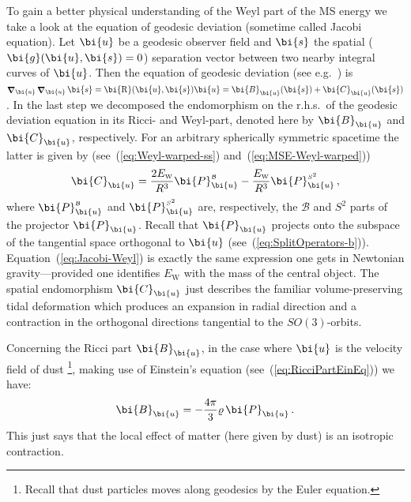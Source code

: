 \documentclass
[rmp,aps,twocolumn,showpacs,preprintnumbers,amsmath,amssymb]{revtex4}
\theoremstyle{plain}
\theoremstyle{definition}
\theoremstyle{remark}
\newcommand{\sss}{\scriptscriptstyle}
\newcommand{\ind}[1]{{\sss \text{#1}}}        %
\DeclareMathOperator{\LC}{\bm{\nabla}}        %
\DeclareMathOperator{\R}{\bi{R}}              %
\newcommand{\B}{\mathcal{B}}                      %
\newcommand{\Stwo}{{S^2}}                         %
\newcommand{\sB}{{\sss \B}}                       %
\newcommand{\sStwo}{{\sss \Stwo}}                 %
\newcommand{\g}{\bg}                            %
\newcommand{\bg}{\bi{g}}
\newcommand{\bs}{\bi{s}}
\newcommand{\bu}{\bi{u}}
\newcommand{\bB}{\bi{B}}
\newcommand{\bC}{\bi{C}}
\newcommand{\bP}{\bi{P}}
\begin{document}
To gain a better physical understanding of the Weyl part of the MS energy 
we take a look at the equation of geodesic deviation (sometime called Jacobi 
equation). Let $\bu$ be a geodesic observer field and $\bs$ the spatial 
($\g(\bu,\bs)=0$) separation vector between two nearby integral curves 
of $\bu$. Then the equation of geodesic deviation (see 
e.g.~\cite{Straumann:2004}) is 
$\LC_\bu\LC_\bu\bs = \R(\bu,\bs)\bu = \bB_\bu(\bs) + \bC_\bu(\bs)$. In the 
last step we decomposed the endomorphism on the r.h.s.~of the geodesic 
deviation equation in its Ricci- and Weyl-part, denoted here by $\bB_\bu$ 
and $\bC_\bu$, respectively. For an arbitrary spherically symmetric 
spacetime the latter is given by (see~(\ref{eq:Weyl-warped-ss}) 
and~(\ref{eq:MSE-Weyl-warped})) 
%
\begin{equation}\label{eq:Jacobi-Weyl}
  \bC_\bu = \frac{2E_\ind{W}}{R^3}\bP_\bu^\sB - 
           \frac{E_\ind{W}}{R^3}\bP_\bu^\sStwo \,,
\end{equation}
%
where $\bP_\bu^\sB$ and $\bP_\bu^\sStwo$ are, respectively, the $\B$ and $\Stwo$ 
parts of the projector $\bP_\bu$. Recall that $\bP_\bu$ projects onto the 
subspace of the tangential space orthogonal to $\bu$ 
(see~(\ref{eq:SplitOperators-b})). Equation~(\ref{eq:Jacobi-Weyl}) is exactly 
the same expression one gets in Newtonian gravity---provided one identifies 
$E_\ind{W}$ with the mass of the central object. The spatial endomorphism 
$\bC_\bu$ just describes the familiar volume-preserving tidal deformation 
which produces an expansion in radial direction and a contraction in 
the orthogonal directions tangential to the $SO(3)$-orbits. 

Concerning the Ricci part $\bB_\bu$, in the case where $\bu$ is the velocity 
field of dust%
\footnote{Recall that dust particles moves along geodesics by the Euler 
equation.},
making use of Einstein's equation (see~(\ref{eq:RicciPartEinEq})) we have: 
%
\begin{equation}\label{eq:Jacobi-Ricci}
  \bB_\bu = - \frac{4\pi}{3}\varrho\,\bP_\bu \,.
\end{equation}
%
This just says that the local effect of matter (here given by dust) is an 
isotropic contraction. 
\end{document}

